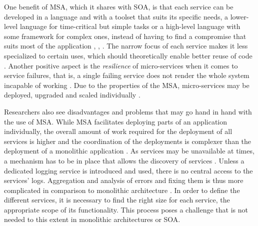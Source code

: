 One benefit of \ac{MSA}, which it shares with \ac{SOA}, is that each service can be developed in a language and with a toolset that suits its specific needs, \eg a lower-level language for time-critical but simple tasks or a high-level language with some framework for complex ones, instead of having to find a compromise that suits most of the application  \cite[p.~35]{Stubbs2015Distributed}, \cite[p.~4]{Newman2015Building}, \cite[p.~113]{Thones2015Microservices}.
The narrow focus of each service makes it less specialized to certain uses, which should theoretically enable better reuse of code \cite[p.~35]{Stubbs2015Distributed}.
Another positive aspect is the \emph{resilience} of micro-services when it comes to service failures, that is, a single failing service does not render the whole system incapable of working \cite[p.~5]{Newman2015Building}.
Due to the properties of the \ac{MSA}, micro-services may be deployed, upgraded and scaled individually \cite[p.~116]{Thones2015Microservices}.

Researchers also see disadvantages and problems that may go hand in hand with the use of \ac{MSA}.
While \ac{MSA} facilitates deploying parts of an application individually, the overall amount of work required for the deployment of all services is higher and the coordination of the deployments is complexer than the deployment of a monolithic application \cite[p.~35]{Stubbs2015Distributed}.
As services may be unavailable at times, a mechanism has to be in place that allows the discovery of services \cite[p.~35]{Stubbs2015Distributed}.
Unless a dedicated logging service is introduced and used, there is no central access to the services' logs. Aggregation and analysis of errors and fixing them is thus more complicated in comparison to monolithic architecture \cite[p.~35]{Stubbs2015Distributed}.
In order to define the different services, it is necessary to find the right size for each service, \ie the appropriate scope of its functionality. This process poses a challenge that is not needed to this extent in monolithic architectures or \ac{SOA}.
